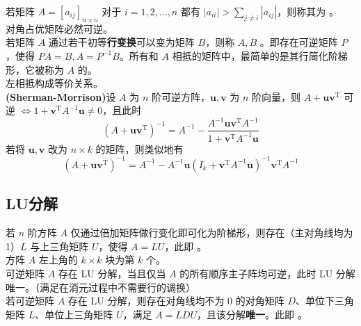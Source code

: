 \documentclass[./main.tex]{subfiles}
\begin{document}
若矩阵 $A=[a_{ij}]_{n\times n}$ 对于 $i=1,2,\dots,n$ 都有 $|a_{ii}|>\sum_{j\neq i}|a_{ij}|$，则称其为 。\\

对角占优矩阵必然可逆。\\

若矩阵 $A$ 通过若干初等\textbf{行变换}可以变为矩阵 $B$，则称 $A,B$ 。即存在可逆矩阵 $P$，使得 $PA=B,A=P^{-1}B$。所有和 $A$ 相抵的矩阵中，最简单的是其行简化阶梯形，它被称为 $A$ 的。\\

左相抵构成等价关系。\\

\textbf{(Sherman-Morrison)}设 $A$ 为 $n$ 阶可逆方阵，$\bm{u},\bm{v}$ 为 $n$ 阶向量，则 $A+\bm{uv}^{\mathrm{T}}$ 可逆 $\iff 1+\bm{v}^{\mathrm{T}}A^{-1}\bm{u}\neq 0$，且此时
\begin{equation}
    (A+\bm{uv}^{\mathrm{T}})^{-1}=A^{-1}-\frac{A^{-1}\bm{uv}^{\mathrm{T}}A^{-1}}{1+\bm{v}^{\mathrm{T}}A^{-1}\bm{u}}
\end{equation}
若将 $\bm{u},\bm{v}$ 改为 $n\times k$ 的矩阵，则类似地有
\begin{equation}
    (A+\bm{uv}^{\mathrm{T}})^{-1}=A^{-1}-A^{-1}\bm{u}(I_k+\bm{v}^{\mathrm{T}}A^{-1}\bm{u})^{-1}\bm{v}^{\mathrm{T}}A^{-1}
\end{equation}

\subsection{LU分解}
若 $n$ 阶方阵 $A$ 仅通过倍加矩阵做行变化即可化为阶梯形，则存在（主对角线均为1）$L$ 与上三角矩阵 $U$，使得 $A=LU$，此即 。\\

方阵 $A$ 左上角的 $k\times k$ 块为第 $k$ 个。\\

可逆矩阵 $A$ 存在 LU 分解，当且仅当 $A$ 的所有顺序主子阵均可逆，此时 LU 分解唯一。（满足在消元过程中不需要行的调换）\\

若可逆矩阵 $A$ 存在 LU 分解，则存在对角线均不为 0 的对角矩阵 $D$、单位下三角矩阵 $L$、单位上三角矩阵 $U$，满足 $A=LDU$，且该分解\textbf{唯一}。此即 。\\
\end{document}
